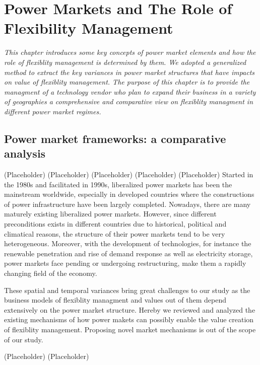 \chapter{Power Markets and The Role of Flexibility Management}
\label{ch:market}
\textit{This chapter introduces some key concepts of power market elements and how the role of flexiblity management is determined by them. We adopted a generalized method to extract the key variances in power market structures that have impacts on value of flexiblity management. The purpose of this chapter is to provide the managment of a technology vendor who plan to expand their business in a variety of geographies a comprehensive and comparative view on flexiblity managment in different power market regimes.}

\section{Power market frameworks: a comparative analysis}
(Placeholder)
\newpage
(Placeholder)
\newpage
(Placeholder)
\newpage
(Placeholder)
\newpage
(Placeholder)
\newpage
Started in the 1980s and facilitated in 1990s, liberalized power markets has been the mainstream worldwide, especially in developed countries where the constructions of power infrastructure have been largely completed. \cite{Srivastava2011} %
Nowadays, there are many maturely existing liberalized power markets. However, since different preconditions exists in different countries due to historical, political and climatical reasons, the structure of their power markets tend to be very heterogeneous. Moreover, with the development of technologies, for instance the renewable penetration and rise of demand response as well as electricity storage, power markets face pending or undergoing restructuring, make them a rapidly changing field of the economy. \cite{Ziel2015}

These spatial and temporal variances bring great challenges to our study as the business models of flexiblity managment and values out of them depend extensively on the power market structure. Hereby we reviewed and analyzed the existing mechanisms of how power makets can possibly enable the value creation of flexiblity management. Proposing novel market mechanisms is out of the scope of our study. 

(Placeholder)
\newpage
(Placeholder)
\newpage

